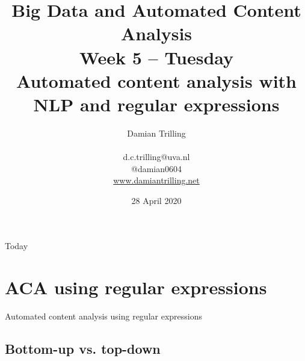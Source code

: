 \documentclass{beamer}
\begin{document}
\title[Big Data and Automated Content Analysis]{\textbf{Big Data and Automated Content Analysis} \\ Week 5 -- Tuesday \\ Automated content analysis with NLP and regular expressions}
\author[Damian Trilling]{Damian Trilling \\ ~ \\ \footnotesize{d.c.trilling@uva.nl \\@damian0604} \\ \url{www.damiantrilling.net}}
\date{28 April 2020}

\begin{frame}[plain]{}
\titlepage
\end{frame}

\begin{frame}{Today}
\tableofcontents
\end{frame}



\section[Regular expressions]{ACA using regular expressions}

\begin{frame}
Automated content analysis using regular expressions
\end{frame}


\subsection{Bottom-up vs. top-down}
\end{document}
